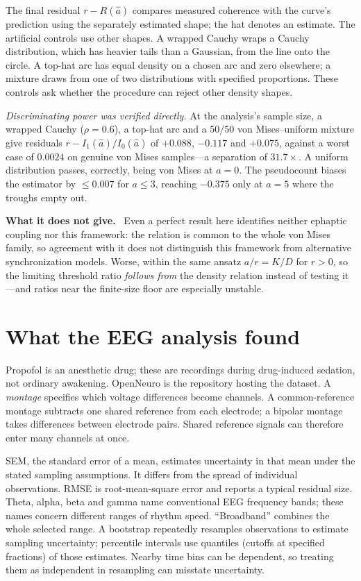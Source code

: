 \documentclass[11pt]{article}
\newcommand{\scope}{\par\smallskip\noindent\textbf{What it does not give.}\ }
\begin{document}
The final residual $r-R(\hat a)$ compares measured coherence with the curve's
prediction using the separately estimated shape; the hat denotes an estimate.
The artificial controls use other shapes. A wrapped Cauchy wraps a Cauchy
distribution, which has heavier tails than a Gaussian, from the line onto the
circle. A top-hat arc has equal density on a chosen arc and zero elsewhere;
a mixture draws from one of two distributions with specified proportions.
These controls ask whether the procedure can reject other density shapes.

\emph{Discriminating power was verified directly.} At the analysis's sample
size, a wrapped Cauchy ($\rho=0.6$), a top-hat arc and a $50/50$ von
Mises--uniform mixture give residuals $r-I_1(\hat a)/I_0(\hat a)$ of $+0.088$,
$-0.117$ and $+0.075$, against a worst case of $0.0024$ on genuine von Mises
samples---a separation of $31.7\times$. A uniform distribution passes,
correctly, being von Mises at $a=0$. The pseudocount biases the estimator by
$\le0.007$ for $a\le3$, reaching $-0.375$ only at $a=5$ where the troughs empty
out.

\scope
Even a perfect result here identifies neither ephaptic coupling nor this
framework: the relation is common to the whole von Mises family, so agreement
with it does not distinguish this framework from alternative synchronization
models. Worse, within the same ansatz $a/r=K/D$ for $r>0$, so the limiting
threshold ratio \emph{follows from} the density relation instead of testing
it---and ratios near the finite-size floor are especially unstable.

\section{What the EEG analysis found}

Propofol is an anesthetic drug; these are recordings during drug-induced
sedation, not ordinary awakening. OpenNeuro is the repository hosting the
dataset. A \emph{montage} specifies which voltage differences become channels.
A common-reference montage subtracts one shared reference from each electrode;
a bipolar montage takes differences between electrode pairs. Shared reference
signals can therefore enter many channels at once.

SEM, the standard error of a mean, estimates uncertainty in that mean under
the stated sampling assumptions. It differs from the spread of individual
observations. RMSE is root-mean-square error and reports a typical residual
size. Theta, alpha, beta and gamma name conventional EEG frequency bands;
these names concern different ranges of rhythm speed. ``Broadband'' combines
the whole selected range. A bootstrap repeatedly resamples observations to
estimate sampling uncertainty; percentile intervals use quantiles (cutoffs at
specified fractions) of those estimates. Nearby time bins can be dependent,
so treating them as independent in resampling can misstate uncertainty.
\end{document}
